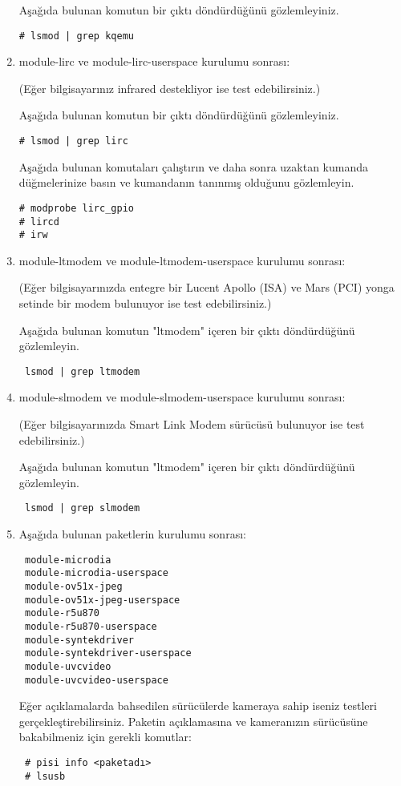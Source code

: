 \documentclass[a4paper,10pt]{article}
\begin{document}
\begin{enumerate}
Aşağıda bulunan komutun bir çıktı döndürdüğünü gözlemleyiniz.
\begin{verbatim}
# lsmod | grep kqemu
\end{verbatim}

\item module-lirc ve module-lirc-userspace kurulumu sonrası:

(Eğer bilgisayarınız infrared destekliyor ise test edebilirsiniz.)

Aşağıda bulunan komutun bir çıktı döndürdüğünü gözlemleyiniz.
\begin{verbatim}
# lsmod | grep lirc
\end{verbatim}

Aşağıda bulunan komutaları çalıştırın ve daha sonra uzaktan kumanda düğmelerinize basın ve kumandanın tanınmış olduğunu gözlemleyin.
\begin{verbatim}
# modprobe lirc_gpio
# lircd
# irw  
\end{verbatim}
\item module-ltmodem ve module-ltmodem-userspace kurulumu sonrası:

(Eğer bilgisayarınızda entegre bir Lucent Apollo (ISA) ve Mars (PCI) yonga setinde bir modem bulunuyor ise test edebilirsiniz.)

Aşağıda bulunan komutun "ltmodem" içeren bir çıktı döndürdüğünü gözlemleyin.
\begin{verbatim}
 lsmod | grep ltmodem
\end{verbatim}

\item module-slmodem ve module-slmodem-userspace kurulumu sonrası:

(Eğer bilgisayarınızda Smart Link Modem sürücüsü bulunuyor ise test edebilirsiniz.)

Aşağıda bulunan komutun "ltmodem" içeren bir çıktı döndürdüğünü gözlemleyin.
\begin{verbatim}
 lsmod | grep slmodem
\end{verbatim}


\item Aşağıda bulunan paketlerin kurulumu sonrası:
\begin{verbatim}
 module-microdia
 module-microdia-userspace
 module-ov51x-jpeg
 module-ov51x-jpeg-userspace
 module-r5u870
 module-r5u870-userspace
 module-syntekdriver
 module-syntekdriver-userspace
 module-uvcvideo
 module-uvcvideo-userspace
\end{verbatim}

Eğer açıklamalarda bahsedilen sürücülerde kameraya sahip iseniz testleri gerçekleştirebilirsiniz.
Paketin açıklamasına ve kameranızın sürücüsüne bakabilmeniz için gerekli komutlar:
\begin{verbatim}
 # pisi info <paketadı>
 # lsusb
\end{verbatim}


\end{enumerate}
\end{document}
